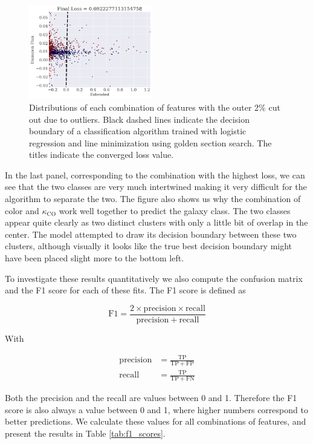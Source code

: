 \begin{figure}
    \includegraphics[width=0.48\textwidth]{results/2d_fit_line_minim_extended_emission_flux.png}
    \caption{Distributions of each combination of features with the outer 2\% cut out due to outliers. Black dashed lines indicate the decision boundary of a classification algorithm trained with logistic regression and line minimization using golden section search. The titles indicate the converged loss value.}
    \label{fig:2d_line_minim_scatter}
\end{figure}

In the last panel, corresponding to the combination with the highest loss, we can see that the two classes are very much intertwined making it very difficult for the algorithm to separate the two. The figure also shows us why the combination of color and $\kappa_{\mathrm{CO}}$ work well together to predict the galaxy class. The two classes appear quite clearly as two distinct clusters with only a little bit of overlap in the center. The model attempted to draw its decision boundary between these two clusters, although visually it looks like the true best decision boundary might have been placed slight more to the bottom left. 

To investigate these results quantitatively we also compute the confusion matrix and the F1 score for each of these fits. The F1 score is defined as

\begin{equation}
    \mathrm{F1} = \frac{2 \times \mathrm{precision} \times \mathrm{recall}}{\mathrm{precision} + \mathrm{recall}}
\end{equation}

With 

\begin{align}
    \mathrm{precision} &= \frac{\mathrm{TP}}{\mathrm{TP}+ \mathrm{FP}} \\
    \mathrm{recall} &= \frac{\mathrm{TP}}{\mathrm{TP} + \mathrm{FN}} 
\end{align}

Both the precision and the recall are values between 0 and 1. Therefore the F1 score is also always a value between 0 and 1, where higher numbers correspond to better predictions. We calculate these values for all combinations of features, and present the results in Table \ref{tab:f1_scores}.

